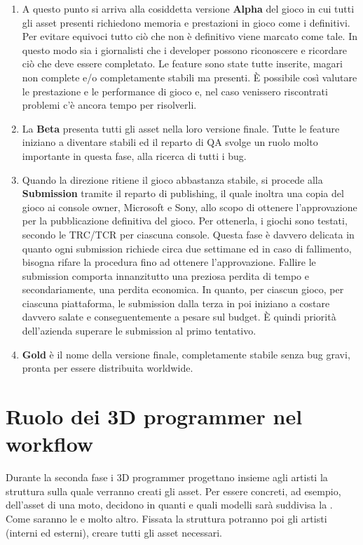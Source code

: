 \begin{enumerate}
	\item A questo punto si arriva alla cosiddetta versione \textbf{Alpha} del gioco in cui tutti gli asset presenti richiedono memoria e prestazioni in gioco come i definitivi. Per evitare equivoci tutto ciò che non è definitivo viene marcato come tale. In questo modo sia i giornalisti che i developer possono riconoscere e ricordare ciò che deve essere completato. Le feature sono state tutte inserite, magari non complete e/o completamente stabili ma presenti. È possibile così valutare le prestazione e le performance di gioco e, nel caso venissero riscontrati problemi c'è ancora tempo per risolverli.
	\item La \textbf{Beta} presenta tutti gli asset nella loro versione finale. Tutte le feature iniziano a diventare stabili ed il reparto di QA svolge un ruolo molto importante in questa fase, alla ricerca di tutti i bug.
	\item Quando la direzione ritiene il gioco abbastanza stabile, si procede alla \textbf{Submission} tramite il reparto di publishing, il quale inoltra una copia del gioco ai console owner, Microsoft e Sony, allo scopo di ottenere l'approvazione per la pubblicazione definitiva del gioco. Per ottenerla, i giochi sono testati, secondo le TRC/TCR per ciascuna console. Questa fase è davvero delicata in quanto ogni submission richiede circa due settimane ed in caso di fallimento, bisogna rifare la procedura fino ad ottenere l'approvazione. Fallire le submission comporta innanzitutto una preziosa perdita di tempo e secondariamente, una perdita economica. In quanto, per ciascun gioco, per ciascuna piattaforma, le submission dalla terza in poi iniziano a costare davvero salate e conseguentemente a pesare sul budget. È quindi priorità dell'azienda superare le submission al primo tentativo.
	\item \textbf{Gold} è il nome della versione finale, completamente stabile senza bug gravi, pronta per essere distribuita worldwide.
\end{enumerate}

\section{Ruolo dei 3D programmer nel workflow}
\label{sec:ruolo-3D-programmer-workflow}

Durante la seconda fase i 3D programmer progettano insieme agli artisti la struttura sulla quale verranno creati gli asset. Per essere concreti, ad esempio, dell'asset di una moto, decidono in quanti e quali modelli sarà suddivisa la . Come saranno le  e molto altro. Fissata la struttura potranno poi gli artisti (interni ed esterni), creare tutti gli asset necessari.\\

